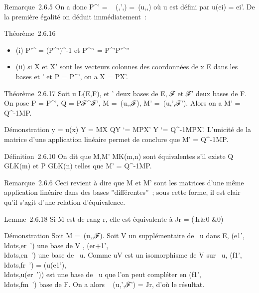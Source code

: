 Remarque~2.6.5 On a donc P^'
= \mathrmMat~
(\mathrmIdE,',) =\
\mathrmMat (u,,) où u est défini par
u(ei) = ei'. De la première égalité on déduit
immédiatement~:

Théorème~2.6.16

\begin{itemize}
\itemsep1pt\parskip0pt
\item
  (i) P'^ = (P^')^-1 et
  P^'` =
  P^'P\mathcal{E}'^''
\item
  (ii) si X et X' sont les vecteurs colonnes des coordonnées de x \in E
  dans les bases  et ' et P = P\mathcal{E}^\mathcal{E}', on a X = PX'.
\end{itemize}

Théorème~2.6.17 Soit u \in L(E,F),  et ' deux bases de E, ℱ et ℱ' deux
bases de F. On pose P = P^\mathcal{E}', Q =
Pℱ^ℱ', M =\
\mathrmMat (u,\mathcal{E},ℱ), M' =\
\mathrmMat (u,',ℱ'). Alors on a M' =
Q^-1MP.

Démonstration y = u(x) \Leftrightarrow Y = MX
\Leftrightarrow QY `= MPX' \mathrel\Leftrightarrow Y
`= Q^-1MPX'. L'unicité de la matrice d'une application
linéaire permet de conclure que M' = Q^-1MP.

Définition~2.6.10 On dit que M,M' \in MK(m,n) sont équivalentes
s'il existe Q \in GLK(m) et P \in GLK(n) telles que M' =
Q^-1MP.

Remarque~2.6.6 Ceci revient à dire que M et M' sont les matrices d'une
même application linéaire dans des bases ''différentes''~; sous cette
forme, il est clair qu'il s'agit d'une relation d'équivalence.

Lemme~2.6.18 Si M est de rang r, elle est équivalente à Jr =
\left
(\matrix\,Ir&0
\cr 0 &0\right )

Démonstration Soit M =\
\mathrmMat (u,,ℱ). Soit V un supplémentaire de
\mathrmKer~u dans E,
(e1',\\ldots,er~')
une base de V ,
(er+1',\\ldots,en~')
une base de \mathrmKer~u.
Comme u\textbar{}V  est un isomorphisme de V sur
\mathrmIm~u,
(f1',\\ldots,fr~')
=
(u(e1'),\\ldots,u(er~'))
est une base de \mathrmIm~u
que l'on peut compléter en
(f1',\\ldots,fm~')
base de F. On a alors
\mathrmMat~ (u,\mathcal{E}',ℱ') =
Jr, d'où le résultat.

